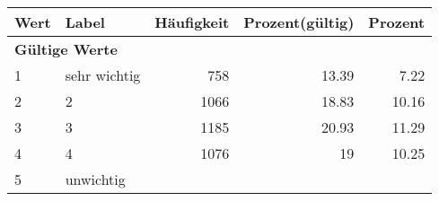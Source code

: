      \begin{longtable}{lXrrr}
     \toprule
     \textbf{Wert} & \textbf{Label} & \textbf{Häufigkeit} & \textbf{Prozent(gültig)} & \textbf{Prozent} \\
     \endhead
     \midrule
     \multicolumn{5}{l}{\textbf{Gültige Werte}}\\

     1 &
     \multicolumn{1}{X}{ sehr wichtig   } &


       \num{758} &
       \num[round-mode=places,round-precision=2]{13,39} &
         \num[round-mode=places,round-precision=2]{7,22} \\

     2 &
     \multicolumn{1}{X}{ 2   } &


       \num{1066} &
       \num[round-mode=places,round-precision=2]{18,83} &
         \num[round-mode=places,round-precision=2]{10,16} \\

     3 &
     \multicolumn{1}{X}{ 3   } &


       \num{1185} &
       \num[round-mode=places,round-precision=2]{20,93} &
         \num[round-mode=places,round-precision=2]{11,29} \\

     4 &
     \multicolumn{1}{X}{ 4   } &


       \num{1076} &
       \num[round-mode=places,round-precision=2]{19} &
         \num[round-mode=places,round-precision=2]{10,25} \\

     5 &
     \multicolumn{1}{X}{ unwichtig   } &



\end{longtable}
